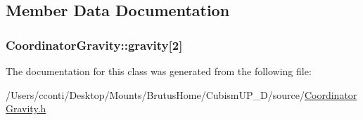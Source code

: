 \subsection{Member Data Documentation}
\hypertarget{class_coordinator_gravity_a81013ceda5bc0f14b814569aaf5988a0}{}
\subsubsection[{gravity}]{ Coordinator\+Gravity\+::gravity\mbox{[}2\mbox{]}\hspace{0.3cm}{\ttfamily [protected]}}\label{class_coordinator_gravity_a81013ceda5bc0f14b814569aaf5988a0}


The documentation for this class was generated from the following file\+:\begin{DoxyCompactItemize}
\item 
/\+Users/cconti/\+Desktop/\+Mounts/\+Brutus\+Home/\+Cubism\+U\+P\+\_\+D/source/\hyperlink{_coordinator_gravity_8h}{Coordinator\+Gravity.\+h}\end{DoxyCompactItemize}
